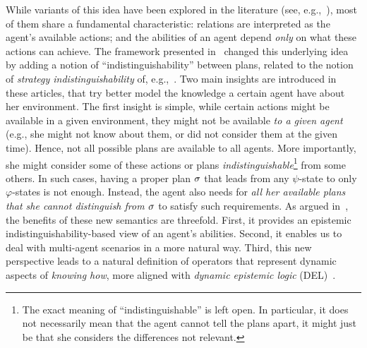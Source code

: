 While variants of this idea have been explored in the literature (see, e.g.,~\cite{Li17,LiWang17,FervariHLW17,Wang19a}),
most of them share a fundamental characteristic: relations are interpreted as the agent's available actions; and the abilities of an agent depend \emph{only} on what these actions can achieve. The framework presented in~\cite{AFSVQ21,AFSVQ23report} changed this underlying idea by adding a notion of ``indistinguishability'' between plans, related to the notion of \emph{strategy indistinguishability} of, e.g.,~\cite{JamrogaH04,Belardinelli14}. Two main insights are introduced in these articles, that try better model the knowledge a certain agent have about her environment.  The first insight is simple, while certain actions might be available in a given environment, they might not be available \emph{to a given agent} (e.g., she might not know about them, or did not consider them at the given time). Hence, not all possible plans are available to all agents.  More importantly, she might consider some of these actions or plans \emph{indistinguishable}\footnote{The exact meaning of ``indistinguishable'' is left open. In particular, it does not necessarily mean that the agent cannot tell the plans apart, it might just be that she considers the differences not relevant.} from some others. In such cases, having a proper plan $\sigma$ that leads from any $\psi$-state to only $\varphi$-states is not enough. Instead, the agent also needs for \emph{all her available plans that she cannot distinguish from $\sigma$} to satisfy such requirements. As argued in~\cite{AFSVQ21}, the benefits of these new semantics are threefold. First, it provides an epistemic indistinguishability-based  view of an agent's abilities. Second, it enables us to deal with multi-agent scenarios in a more natural way. Third, this new perspective leads to a natural definition of operators that represent dynamic aspects of \emph{knowing how}, more aligned with \emph{dynamic epistemic logic} (DEL)~\cite{DELbook}.
%
